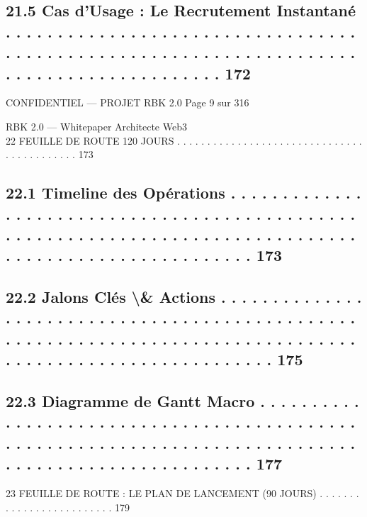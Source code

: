 \documentclass[12pt,landscape,a4paper]{article}
\newenvironment{confidential}
{\begin{tcolorbox}[
    colback=rbkred!5!white,
    colframe=rbkred!75!black,
    title=CONFIDENTIEL,
    fonttitle=\bfseries\color{white},
    coltitle=rbkred!75!black,
    breakable,
    enhanced,
    frame hidden,
    borderline west={2pt}{0pt}{rbkred!75!black}
]}
{\end{tcolorbox}}
\begin{document}
\subsection{21.5    Cas d’Usage : Le Recrutement Instantané . . . . . . . . . . . . . . . . . . . . . . . . . . . . . . . . . . . . . . . . . . . . . . . . . . . . . . . . . . . . . . . . . . . . . . . . . . . . . . . . . . . . . . . . . 172}
\vspace{0.5em}
\vspace{0.5em}
\vspace{0.5em}
\begin{confidential}CONFIDENTIEL — PROJET RBK 2.0                                                                                Page 9 sur 316\end{confidential}
RBK 2.0 — Whitepaper Architecte Web3\\
\vspace{0.5em}
\vspace{0.5em}
22    FEUILLE DE ROUTE 120 JOURS . . . . . . . . . . . . . . . . . . . . . . . . . . . . . . . . . . . . . . . . . . . 173\\
\subsection{22.1    Timeline des Opérations . . . . . . . . . . . . . . . . . . . . . . . . . . . . . . . . . . . . . . . . . . . . . . . . . . . . . . . . . . . . . . . . . . . . . . . . . . . . . . . . . . . . . . . . . . . . . . . . . . . . . . . . . 173}
\subsection{22.2    Jalons Clés \textbackslash{}& Actions . . . . . . . . . . . . . . . . . . . . . . . . . . . . . . . . . . . . . . . . . . . . . . . . . . . . . . . . . . . . . . . . . . . . . . . . . . . . . . . . . . . . . . . . . . . . . . . . . . . . . . . . . . . . 175}
\subsection{22.3    Diagramme de Gantt Macro . . . . . . . . . . . . . . . . . . . . . . . . . . . . . . . . . . . . . . . . . . . . . . . . . . . . . . . . . . . . . . . . . . . . . . . . . . . . . . . . . . . . . . . . . . . . . . . . . . . . . . 177}
\vspace{0.5em}
23    FEUILLE DE ROUTE : LE PLAN DE LANCEMENT (90 JOURS) . . . . . . . . . . . . . . . . . . . . . . . . . 179\\
\end{document}
